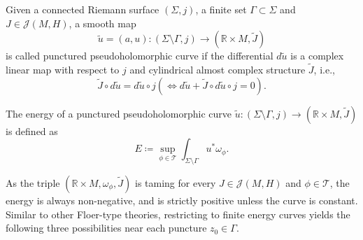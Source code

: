 \documentclass[11pt, a4paper]{amsart}
\newcommand{\cJ}{\mathcal{J}}
\newcommand{\cT}{\mathcal{T}}
\begin{document}
\begin{definition}
Given a connected Riemann surface $(\Sigma,j)$, a finite set $\Gamma \subset \Sigma$ and $J \in \cJ(M,H)$, a smooth map
$$\tilde{u} = (a, u)\colon (\Sigma \setminus \Gamma,j) \rightarrow (\mathbb{R} \times M,\tilde{J})$$
is called punctured pseudoholomorphic curve if the differential $d\tilde{u}$ is a complex linear map with respect to $j$ and cylindrical almost complex structure $\tilde{J}$, i.e.,
$$\tilde{J} \circ d\tilde{u} = d\tilde{u}\circ j \left(\iff d\tilde{u} + \tilde{J} \circ d \tilde{u} \circ j = 0\right).$$ 
\end{definition}

\begin{definition}
The energy of a punctured pseudoholomorphic curve $\tilde{u}\colon (\Sigma \setminus \Gamma,j) \rightarrow (\mathbb{R} \times M,\tilde{J})$  is defined as
$$E\coloneqq \sup_{\phi \in \cT} \int_{{\Sigma\setminus \Gamma}} u^*\omega_{\phi}.$$
\end{definition}

As the triple $(\mathbb{R}\times M, \omega_{\phi},\tilde{J})$ is taming for every  $J\in \cJ(M,H)$ and $\phi \in \cT$, the energy is always
non-negative, and is strictly positive unless the curve is constant. Similar to other Floer-type theories, restricting to finite energy curves yields the following three possibilities near each puncture  $z_0\in \Gamma$.
\end{document}
